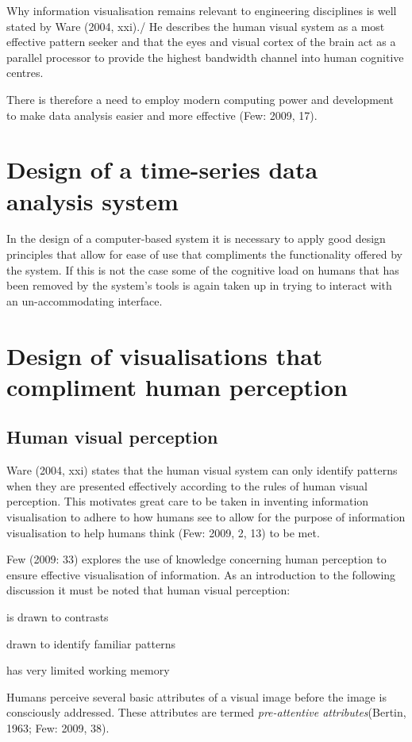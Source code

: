 \documentclass[a4paper,12pt]{article}
\begin{document}
 Why information visualisation remains relevant to engineering disciplines is well stated by Ware (2004, xxi)./
 He describes the human visual system as a most effective pattern seeker and that the eyes and visual cortex of the
 brain act as a parallel processor to provide the highest bandwidth channel into human cognitive centres.

 There is therefore a need to employ modern computing power and development to make data analysis easier and more
 effective (Few: 2009, 17).

 \section{Design of a time-series data analysis system}
 In the design of a computer-based system it is necessary to apply good design principles that allow for ease of use that compliments the
 functionality offered by the system. If this is not the case some of the cognitive load on humans that has been removed by the system's tools
 is again taken up in trying to interact with an un-accommodating interface.

 \section{Design of visualisations that compliment human perception}
 \subsection{Human visual perception}
 Ware (2004, xxi) states that the human visual system can only identify patterns when they are presented effectively according to the
rules of human visual perception. This motivates great care to be taken in inventing information visualisation to adhere to how humans
see to allow for the purpose of information visualisation to help humans think (Few: 2009, 2, 13) to be met.
 
 Few (2009: 33) explores the use of knowledge concerning human perception to ensure effective visualisation of information.
 As an introduction to the following discussion it must be noted that human visual perception:
   \item{is drawn to contrasts}
   \item{drawn to identify familiar patterns}
   \item{has very limited working memory}
     
     Humans perceive several basic attributes of a visual image before the image is consciously addressed. These attributes are termed
     \emph{pre-attentive attributes}(Bertin, 1963; Few: 2009, 38).
\end{document}
